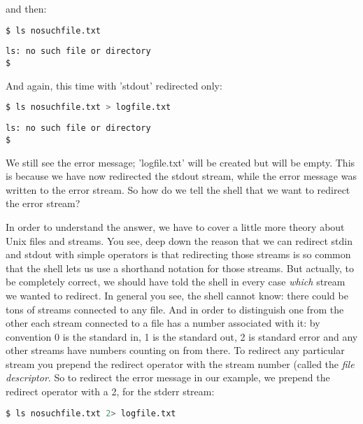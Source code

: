 and then:
\lstset{basicstyle=\scriptsize, numbers=left, captionpos=b, tabsize=4}
\begin{lstlisting}[caption=Listing a non-existent file,language={bash},
breaklines=true,xleftmargin=15pt,label=lst:Listing a non-existent file]
$ ls nosuchfile.txt
\end{lstlisting}

\scriptsize
\begin{verbatim}
ls: no such file or directory 
$
\end{verbatim}
\normalsize

And again, this time with 'stdout' redirected only:
\lstset{basicstyle=\scriptsize, numbers=left, captionpos=b, tabsize=4}
\begin{lstlisting}[caption=Trying to redirect...,language={bash},
breaklines=true,xleftmargin=15pt,label=lst:Trying to redirect...]
$ ls nosuchfile.txt > logfile.txt
\end{lstlisting}

\scriptsize
\begin{verbatim}
ls: no such file or directory
$
\end{verbatim}
\normalsize

We still see the error message; 'logfile.txt' will be created but will be
empty. This is because we have now redirected the stdout stream, while the
error message was written to the error stream. So how do we tell the shell that
we want to redirect the error stream?

In order to understand the answer, we have to cover a little more theory about
Unix files and streams. You see, deep down the reason that we can redirect
stdin and stdout with simple operators is that redirecting those streams is so
common that the shell lets us use a shorthand notation for those streams. But
actually, to be completely correct, we should have told the shell in every case
\emph{which} stream we wanted to redirect. In general you see, the shell cannot
know: there could be tons of streams connected to any file. And in order to
distinguish one from the other each stream connected to a file has a number
associated with it: by convention 0 is the standard in, 1 is the standard out,
2 is standard error and any other streams have numbers counting on from there.
To redirect any particular stream you prepend the redirect operator with the
stream number (called the \emph{file descriptor}. So to redirect the error
message in our example, we prepend the redirect operator with a 2, for the
stderr stream:
\lstset{basicstyle=\scriptsize, numbers=left, captionpos=b, tabsize=4}
\begin{lstlisting}[caption=Redirecting the stderr stream,language={bash},
breaklines=true,xleftmargin=15pt,label=lst:Redirecting the stderr stream]
$ ls nosuchfile.txt 2> logfile.txt
\end{lstlisting}


